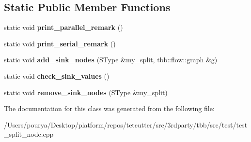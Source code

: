 \subsection*{Static Public Member Functions}
\begin{DoxyCompactItemize}
\item 
\hypertarget{classsink__node__helper_ae6898ad99349ca6ad5e18896845dc1ff}{}static void {\bfseries print\+\_\+parallel\+\_\+remark} ()\label{classsink__node__helper_ae6898ad99349ca6ad5e18896845dc1ff}

\item 
\hypertarget{classsink__node__helper_a0ad5f963d14087830a98af7a2f97828b}{}static void {\bfseries print\+\_\+serial\+\_\+remark} ()\label{classsink__node__helper_a0ad5f963d14087830a98af7a2f97828b}

\item 
\hypertarget{classsink__node__helper_aa02261c79afed8efa1c7d6ed59a0021b}{}static void {\bfseries add\+\_\+sink\+\_\+nodes} (S\+Type \&my\+\_\+split, tbb\+::flow\+::graph \&g)\label{classsink__node__helper_aa02261c79afed8efa1c7d6ed59a0021b}

\item 
\hypertarget{classsink__node__helper_af0b297ea9dbc43de22a6102ad536684d}{}static void {\bfseries check\+\_\+sink\+\_\+values} ()\label{classsink__node__helper_af0b297ea9dbc43de22a6102ad536684d}

\item 
\hypertarget{classsink__node__helper_a6464277261a8e574faf6d49086d1536e}{}static void {\bfseries remove\+\_\+sink\+\_\+nodes} (S\+Type \&my\+\_\+split)\label{classsink__node__helper_a6464277261a8e574faf6d49086d1536e}

\end{DoxyCompactItemize}


The documentation for this class was generated from the following file\+:\begin{DoxyCompactItemize}
\item 
/\+Users/pourya/\+Desktop/platform/repos/tetcutter/src/3rdparty/tbb/src/test/test\+\_\+split\+\_\+node.\+cpp\end{DoxyCompactItemize}
